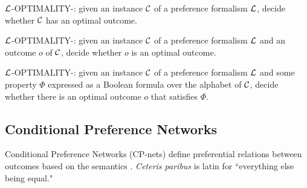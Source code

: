 \begin{definition}
\label{def:opt1}
  $\mathcal{L}$-OPTIMALITY-: given an instance $\mathcal{C}$ of a preference
	formalism $\mathcal{L}$,
  decide whether $\mathcal{C}$ has an optimal outcome.
\end{definition}

\begin{definition}
\label{def:opt2}
  $\mathcal{L}$-OPTIMALITY-: given an instance $\mathcal{C}$ of a preference
	formalism $\mathcal{L}$ and an outcome $o$ of $\mathcal{C}$,
  decide whether $o$ is an optimal outcome.
\end{definition}

\begin{definition}
\label{def:opt3}
  $\mathcal{L}$-OPTIMALITY-: given an instance $\mathcal{C}$ of a preference
	formalism $\mathcal{L}$ and some property $\Phi$ expressed as a Boolean formula 
	over the alphabet of $\mathcal{C}$,
  decide whether there is an optimal outcome $o$ that satisfies $\Phi$.
\end{definition}

\subsection{Conditional Preference Networks}
Conditional Preference Networks (CP-nets) define preferential relations between outcomes
based on the 
semantics \cite{bbdh03}.
\textit{Ceteris paribus} is latin for ``everything else being equal."

